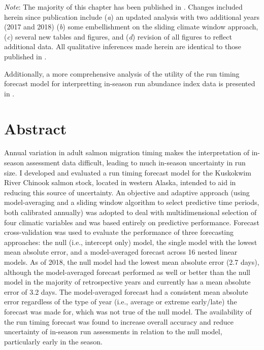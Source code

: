 \documentclass[12pt,]{book}
\theoremstyle{definition}
\theoremstyle{definition}
\theoremstyle{definition}
\theoremstyle{remark}
\begin{document}
\singlespacing
\noindent
\footnotesize
\textit{Note}: The majority of this chapter has been published in
\cite{staton-etal-2017-rtf}. Changes included herein since publication
include (\textit{a}) an updated analysis with two additional years (2017
and 2018) (\textit{b}) some embellishment on the sliding climate window
approach, (\textit{c}) several new tables and figures, and (\textit{d})
revision of all figures to reflect additional data. All qualitative
inferences made herein are identical to those published in
\cite{staton-etal-2017-rtf}.

\vspace{0.25cm}

\noindent
Additionally, a more comprehensive analysis of the utility of the run
timing forecast model for interpretting in-season run abundance index
data is presented in \citet{staton-catalano-2019}. \singlespacing

\normalsize
\doublespacing

\section*{Abstract}\label{abstract}

\noindent
Annual variation in adult salmon migration timing makes the
interpretation of in-season assessment data difficult, leading to much
in-season uncertainty in run size. I developed and evaluated a run
timing forecast model for the Kuskokwim River Chinook salmon stock,
located in western Alaska, intended to aid in reducing this source of
uncertainty. An objective and adaptive approach (using model-averaging
and a sliding window algorithm to select predictive time periods, both
calibrated annually) was adopted to deal with multidimensional selection
of four climatic variables and was based entirely on predictive
performance. Forecast cross-validation was used to evaluate the
performance of three forecasting approaches: the null (i.e., intercept
only) model, the single model with the lowest mean absolute error, and a
model-averaged forecast across 16 nested linear models. As of 2018, the
null model had the lowest mean absolute error (2.7 days), although the
model-averaged forecast performed as well or better than the null model
in the majority of retrospective years and currently has a mean absolute
error of 3.2 days. The model-averaged forecast had a consistent mean
absolute error regardless of the type of year (i.e., average or extreme
early/late) the forecast was made for, which was not true of the null
model. The availability of the run timing forecast was found to increase
overall accuracy and reduce uncertainty of in-season run assessments in
relation to the null model, particularly early in the season.
\end{document}
